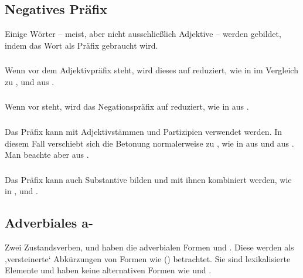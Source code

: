 \subsection{Negatives Präfix} Einige Wörter -- meist, aber nicht ausschließlich Adjektive -- werden gebildet, indem das Wort   als Präfix gebraucht wird.

\subsubsection{} Wenn  vor dem Adjektivpräfix  steht, wird dieses auf  reduziert, wie in   im Vergleich zu  , und   aus  .

\subsubsection{} Wenn  vor  steht, wird das Negationspräfix auf  reduziert, wie in   aus  .

\subsubsection{} Das Präfix  kann mit Adjektivstämmen und Partizipien verwendet werden. In diesem Fall verschiebt sich die Betonung normalerweise zu , wie in   aus   und   aus  . Man beachte aber   aus  .\label{lingop:prefix:ke}

\subsubsection{} Das Präfix  kann auch Substantive bilden und mit ihnen kombiniert werden, wie in  , und  . 

\subsection{Adverbiales a-} Zwei Zustandsverben,   und   haben die adverbialen Formen   und  . Diese werden als ,versteinerte‘ Abkürzungen von Formen wie  () betrachtet. Sie sind lexikalisierte Elemente und haben keine alternativen Formen wie  und .

